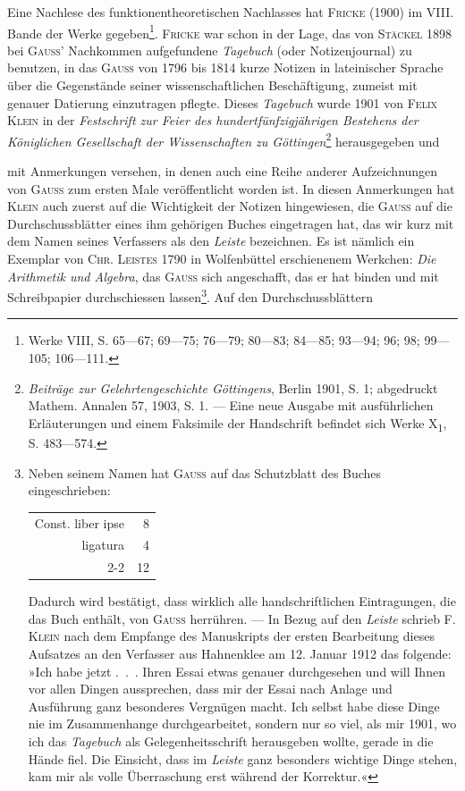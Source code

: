 Eine Nachlese des funktionentheoretischen Nachlasses hat \textsc{Fricke} (1900) im
VIII. Bande der Werke gegeben\footnote{Werke VIII, S. 65—67; 69—75; 76—79; 80—83; 84—85; 93—94; 96; 98; 99—105; 106—111.}. \textsc{Fricke} war schon in der Lage, das von \textsc{Stäckel}
1898 bei \textsc{Gauss}’ Nachkommen aufgefundene \textit{Tagebuch} (oder Notizenjournal)
zu benutzen, in das \textsc{Gauss} von 1796 bis 1814 kurze Notizen in lateinischer
Sprache über die Gegenstände seiner wissenschaftlichen Beschäftigung, zumeist
mit genauer Datierung einzutragen pflegte. Dieses \textit{Tagebuch} wurde 1901 von
\textsc{Felix Klein} in der \textit{Festschrift zur Feier des hundertfünfzigjährigen Bestehens
der Königlichen Gesellschaft der Wissenschaften zu Göttingen}\footnote{\textit{Beiträge zur Gelehrtengeschichte Göttingens}, Berlin 1901, S. 1; abgedruckt Mathem. Annalen 57, 1903, S. 1. — Eine neue Ausgabe mit ausführlichen Erläuterungen und einem Faksimile der Handschrift befindet sich Werke X\textsubscript{1}, S. 483—574.} herausgegeben und\par
\clearpage{}
\noindent mit Anmerkungen versehen, in denen auch eine Reihe anderer Aufzeichnungen
von \textsc{Gauss} zum ersten Male veröffentlicht worden ist. In diesen Anmerkungen
hat \textsc{Klein} auch zuerst auf die Wichtigkeit der Notizen hingewiesen, die \textsc{Gauss}
auf die Durchschussblätter eines ihm gehörigen Buches eingetragen hat, das
wir kurz mit dem Namen seines Verfassers als den \textit{Leiste} bezeichnen. Es ist
nämlich ein Exemplar von \textsc{Chr. Leistes} 1790 in Wolfenbüttel erschienenem
Werkchen: \textit{Die Arithmetik und Algebra}, das \textsc{Gauss} sich angeschafft, das er hat
binden und mit Schreibpapier durchschiessen lassen\footnote{Neben seinem Namen hat \textsc{Gauss} auf das Schutzblatt des Buches eingeschrieben:
\begin{center}\begin{tabular}{r@{\quad}r}
Const. liber ipse&8\\
ligatura&4\\\cline{2-2}
&12
\end{tabular}\end{center}
\noindent Dadurch wird bestätigt, dass wirklich alle handschriftlichen Eintragungen, die das Buch enthält, von \textsc{Gauss} herrühren. — In Bezug auf den \textit{Leiste} schrieb F. \textsc{Klein} nach dem Empfange des Manuskripts der ersten Bearbeitung dieses Aufsatzes an den Verfasser aus Hahnenklee am 12. Januar 1912 das folgende: »Ich habe jetzt .\ .\ . Ihren Essai etwas genauer durchgesehen und will Ihnen vor allen Dingen aussprechen, dass mir der Essai nach Anlage und Ausführung ganz besonderes Vergnügen macht. Ich selbst habe diese Dinge nie im Zusammenhange durchgearbeitet, sondern nur so viel, als mir 1901, wo ich das \textit{Tagebuch} als Gelegenheitsschrift herausgeben wollte, gerade in die Hände fiel. Die Einsicht, dass im \textit{Leiste} ganz besonders wichtige Dinge stehen, kam mir als volle Überraschung erst während der Korrektur.«}. Auf den Durchschussblättern
